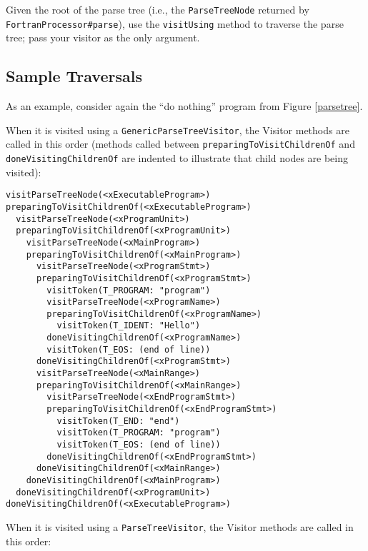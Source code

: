 Given the root of the parse tree (i.e., the \texttt{ParseTreeNode} returned
by \texttt{FortranProcessor\#parse}), use the \texttt{visitUsing} method
to traverse the parse tree; pass your visitor as the only argument.

\subsection{Sample Traversals}

As an example, consider again the ``do nothing'' program from Figure \ref{parsetree}.

When it is visited using a \texttt{GenericParseTreeVisitor}, the Visitor
methods are called in this order (methods called between \texttt{preparingToVisitChildrenOf}
and \texttt{doneVisitingChildrenOf} are indented to illustrate that child nodes
are being visited):

\begin{verbatim}
visitParseTreeNode(<xExecutableProgram>)
preparingToVisitChildrenOf(<xExecutableProgram>)
  visitParseTreeNode(<xProgramUnit>)
  preparingToVisitChildrenOf(<xProgramUnit>)
    visitParseTreeNode(<xMainProgram>)
    preparingToVisitChildrenOf(<xMainProgram>)
      visitParseTreeNode(<xProgramStmt>)
      preparingToVisitChildrenOf(<xProgramStmt>)
        visitToken(T_PROGRAM: "program")
        visitParseTreeNode(<xProgramName>)
        preparingToVisitChildrenOf(<xProgramName>)
          visitToken(T_IDENT: "Hello")
        doneVisitingChildrenOf(<xProgramName>)
        visitToken(T_EOS: (end of line))
      doneVisitingChildrenOf(<xProgramStmt>)
      visitParseTreeNode(<xMainRange>)
      preparingToVisitChildrenOf(<xMainRange>)
        visitParseTreeNode(<xEndProgramStmt>)
        preparingToVisitChildrenOf(<xEndProgramStmt>)
          visitToken(T_END: "end")
          visitToken(T_PROGRAM: "program")
          visitToken(T_EOS: (end of line))
        doneVisitingChildrenOf(<xEndProgramStmt>)
      doneVisitingChildrenOf(<xMainRange>)
    doneVisitingChildrenOf(<xMainProgram>)
  doneVisitingChildrenOf(<xProgramUnit>)
doneVisitingChildrenOf(<xExecutableProgram>)
\end{verbatim}

When it is visited using a \texttt{ParseTreeVisitor}, the Visitor
methods are called in this order:

